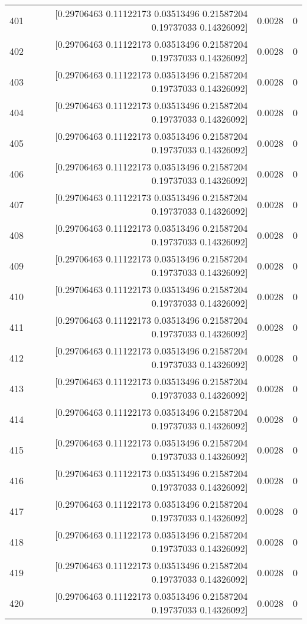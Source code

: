 \begin{longtable}{lrrr}
401 & [0.29706463 0.11122173 0.03513496 0.21587204 0.19737033 0.14326092] & 0.0028 & 0 \\
402 & [0.29706463 0.11122173 0.03513496 0.21587204 0.19737033 0.14326092] & 0.0028 & 0 \\
403 & [0.29706463 0.11122173 0.03513496 0.21587204 0.19737033 0.14326092] & 0.0028 & 0 \\
404 & [0.29706463 0.11122173 0.03513496 0.21587204 0.19737033 0.14326092] & 0.0028 & 0 \\
405 & [0.29706463 0.11122173 0.03513496 0.21587204 0.19737033 0.14326092] & 0.0028 & 0 \\
406 & [0.29706463 0.11122173 0.03513496 0.21587204 0.19737033 0.14326092] & 0.0028 & 0 \\
407 & [0.29706463 0.11122173 0.03513496 0.21587204 0.19737033 0.14326092] & 0.0028 & 0 \\
408 & [0.29706463 0.11122173 0.03513496 0.21587204 0.19737033 0.14326092] & 0.0028 & 0 \\
409 & [0.29706463 0.11122173 0.03513496 0.21587204 0.19737033 0.14326092] & 0.0028 & 0 \\
410 & [0.29706463 0.11122173 0.03513496 0.21587204 0.19737033 0.14326092] & 0.0028 & 0 \\
411 & [0.29706463 0.11122173 0.03513496 0.21587204 0.19737033 0.14326092] & 0.0028 & 0 \\
412 & [0.29706463 0.11122173 0.03513496 0.21587204 0.19737033 0.14326092] & 0.0028 & 0 \\
413 & [0.29706463 0.11122173 0.03513496 0.21587204 0.19737033 0.14326092] & 0.0028 & 0 \\
414 & [0.29706463 0.11122173 0.03513496 0.21587204 0.19737033 0.14326092] & 0.0028 & 0 \\
415 & [0.29706463 0.11122173 0.03513496 0.21587204 0.19737033 0.14326092] & 0.0028 & 0 \\
416 & [0.29706463 0.11122173 0.03513496 0.21587204 0.19737033 0.14326092] & 0.0028 & 0 \\
417 & [0.29706463 0.11122173 0.03513496 0.21587204 0.19737033 0.14326092] & 0.0028 & 0 \\
418 & [0.29706463 0.11122173 0.03513496 0.21587204 0.19737033 0.14326092] & 0.0028 & 0 \\
419 & [0.29706463 0.11122173 0.03513496 0.21587204 0.19737033 0.14326092] & 0.0028 & 0 \\
420 & [0.29706463 0.11122173 0.03513496 0.21587204 0.19737033 0.14326092] & 0.0028 & 0 \\

\end{longtable}
